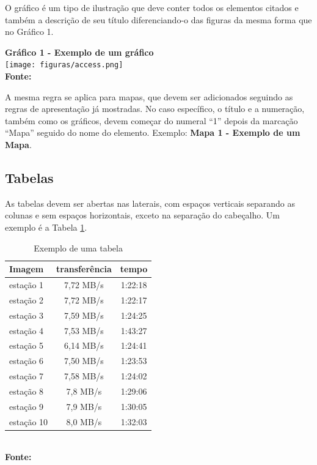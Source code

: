 O gráfico é um tipo de ilustração que deve conter todos os elementos citados e também a descrição de seu título
diferenciando-o das figuras da mesma forma que no Gráfico 1. 

\begin{center}
	\centering	
 	\textbf{Gráfico 1 - Exemplo de um gráfico} \\
	\texttt{[image: figuras/access.png]}
	 \vspace{-0.3cm}
	\\\textbf{\footnotesize Fonte: }
	\label{grafico1}
\end{center}

A mesma regra se aplica para mapas, que devem ser adicionados seguindo as regras de apresentação já mostradas. No caso específico,
o título e a numeração, também como os gráficos, devem começar do numeral ``1'' depois da marcação ``Mapa'' seguido do nome do elemento.
Exemplo: \textbf{Mapa 1 - Exemplo de um Mapa}.

 \subsection{\esp Tabelas}

As tabelas devem ser abertas nas laterais, com espaços verticais separando
as colunas e sem espaços horizontais, exceto na
separação do cabeçalho. Um exemplo é a Tabela \ref{tab:tabela1}. 

\begin{table}[htb]
	\centering
	\caption{\hspace{0.1cm} Exemplo de uma tabela}
	\vspace{-0.3cm} %
	\label{tab:tabela1}
	\begin{tabular}{l|c|c}
  \hline
    \textbf{Imagem}	& \textbf{transferência} & \textbf{tempo} \\
    \hline
     estação 1	& 7,72 MB/s &  1:22:18 \\
     estação 2	& 7,72 MB/s &  1:22:17 \\
     estação 3	& 7,59 MB/s & 1:24:25 \\
     estação 4  & 7,53 MB/s & 1:43:27 \\
     estação 5	& 6,14 MB/s  &  1:24:41 \\
     estação 6  &  7,50 MB/s & 1:23:53 \\
     estação 7  & 7,58 MB/s  &  1:24:02 \\
     estação 8  & 7,8 MB/s  &  1:29:06 \\
     estação 9  & 7,9 MB/s  &  1:30:05 \\
     estação 10 & 8,0 MB/s  &  1:32:03 \\
     \hline
 \end{tabular}
 	\vspace{.1cm}  %
	\small
	{\footnotesize\\ \textbf{Fonte: }}
\end{table}
   

